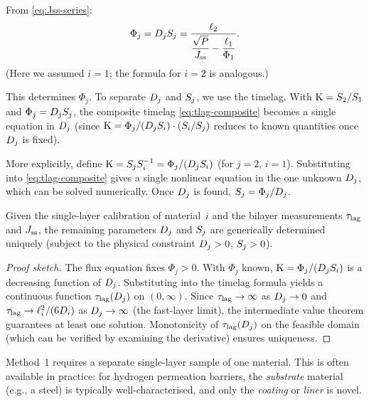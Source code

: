 From \cref{eq:Jss-series}:
\begin{equation}
  \label{eq:method1-flux}
  \Phi_j = D_{j}S_{j}
  = \frac{\ell_{2}}{\dfrac{\sqrt{P}}{J_{\mathrm{ss}}} - \dfrac{\ell_{1}}{\Phi_1}}.
\end{equation}
(Here we assumed $i=1$; the formula for $i=2$ is analogous.)

This determines $\Phi_j$.  To separate $D_{j}$ and $S_{j}$, we use the
timelag.  With $\mathrm{K} = S_{2}/S_{1}$ and $\Phi_j = D_{j}S_{j}$, the
composite timelag \cref{eq:tlag-composite} becomes a single equation in
$D_{j}$ (since $\mathrm{K} = \Phi_j/(D_{j}S_{i}) \cdot (S_{i}/S_{j})$
reduces to known quantities once $D_{j}$ is fixed).

More explicitly, define $\mathrm{K} = S_{j}S_{i}^{-1} = \Phi_j/(D_{j}S_{i})$
(for $j=2$, $i=1$).  Substituting into \cref{eq:tlag-composite} gives a
single nonlinear equation in the one unknown $D_{j}$, which can be solved
numerically.  Once $D_{j}$ is found, $S_{j} = \Phi_j/D_{j}$.

\begin{proposition}
\label{prop:method1-solvability}
Given the single-layer calibration of material~$i$ and the bilayer measurements
$\tau_{\mathrm{lag}}$ and $J_{\mathrm{ss}}$, the remaining parameters $D_{j}$ and $S_{j}$ are
generically determined uniquely (subject to the physical constraint
$D_{j} > 0$, $S_{j} > 0$).
\end{proposition}

\begin{proof}[Proof sketch]
The flux equation fixes $\Phi_j > 0$.  With $\Phi_j$ known, $\mathrm{K} =
\Phi_j/(D_{j}S_{i})$ is a decreasing function of $D_{j}$.  Substituting
into the timelag formula yields a continuous function $\tau_{\mathrm{lag}}(D_{j})$ on
$(0,\infty)$.  Since $\tau_{\mathrm{lag}} \to \infty$ as $D_{j} \to 0$ and $\tau_{\mathrm{lag}} \to
\ell_{i}^2/(6D_{i})$ as $D_{j} \to \infty$ (the fast-layer limit), the
intermediate value theorem guarantees at least one solution.  Monotonicity of
$\tau_{\mathrm{lag}}(D_{j})$ on the feasible domain (which can be verified by examining the
derivative) ensures uniqueness.
\end{proof}

\begin{remark}
Method~1 requires a separate single-layer sample of one material.  This is
often available in practice: for hydrogen permeation barriers, the
\emph{substrate} material (e.g., a steel) is typically well-characterised,
and only the \emph{coating} or \emph{liner} is novel.
\end{remark}

